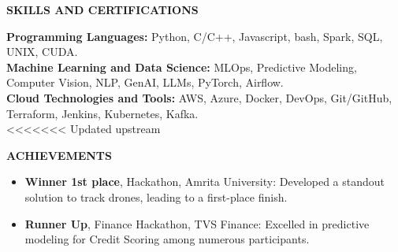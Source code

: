 \documentclass[10pt,a4]{article}
\begin{document}
{\begin{flushleft}
    {\large \textbf {SKILLS AND CERTIFICATIONS}}
    
        \vspace{1mm}
            \hspace{0.5cm}  \textbf{Programming Languages:} Python, C/C++, Javascript, bash, Spark, SQL, UNIX, CUDA. \\
            \hspace{0.5cm}  \textbf{Machine Learning and Data Science:} MLOps, Predictive Modeling, Computer Vision, NLP, GenAI, LLMs, PyTorch, Airflow. \\
            \hspace{0.5cm}  \textbf{Cloud Technologies and Tools:} AWS, Azure, Docker, DevOps, Git/GitHub, Terraform, Jenkins, Kubernetes, Kafka. \\
        

<<<<<<< Updated upstream
\end{flushleft}


\begin{flushleft}
        {\Large \textbf{ACHIEVEMENTS}}
        \vspace{1.5mm}
            \begin{itemize}
            \item \textbf{Winner 1st place}, Hackathon, Amrita University: Developed a standout solution to track drones, leading to a first-place finish.
            \item \textbf{Runner Up}, Finance Hackathon, TVS Finance: Excelled in predictive modeling for Credit Scoring among numerous participants.
            \end{itemize}


\end{flushleft}}
\end{document}
